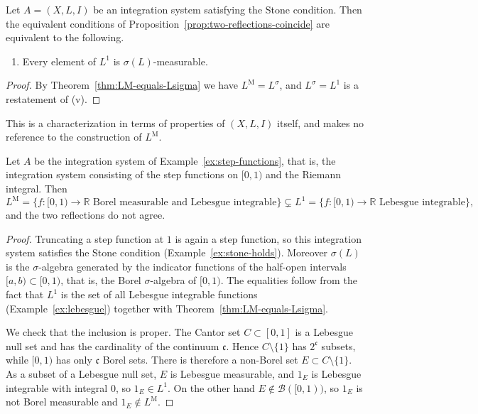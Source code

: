 \begin{corollary}\label{cor:when-coincide-sigma}
  Let $A=(X,L,I)$ be an integration system satisfying the Stone condition.
  Then the equivalent conditions of
  Proposition~\ref{prop:two-reflections-coincide} are equivalent to the
  following.
  \begin{enumerate}
    \item[(v)] Every element of $L^1$ is $\sigma(L)$-measurable.
  \end{enumerate}
\end{corollary}
\begin{proof}
  By Theorem~\ref{thm:LM-equals-Lsigma} we have
  $L^{\mathrm{M}}=L^{\sigma}$, and $L^{\sigma}=L^1$ is a restatement of (v).
\end{proof}

\noindent
This is a characterization in terms of properties of $(X,L,I)$ itself, and makes
no reference to the construction of $L^{\mathrm{M}}$.

\begin{corollary}\label{cor:lebesgue-reflections-differ}
  Let $A$ be the integration system of Example~\ref{ex:step-functions}, that is,
  the integration system consisting of the step functions on $[0,1)$ and the
  Riemann integral. Then
  \[
    L^{\mathrm{M}}=\{f:[0,1)\to\mathbb{R}\text{ Borel measurable and Lebesgue integrable}\}
    \subsetneq L^1
    =\{f:[0,1)\to\mathbb{R}\text{ Lebesgue integrable}\} ,
  \]
  and the two reflections do not agree.
\end{corollary}
\begin{proof}
  Truncating a step function at $1$ is again a step function, so this
  integration system satisfies the Stone condition
  (Example~\ref{ex:stone-holds}).
  Moreover $\sigma(L)$ is the $\sigma$-algebra generated by the indicator
  functions of the half-open intervals $[a,b)\subset[0,1)$, that is, the Borel
  $\sigma$-algebra of $[0,1)$.
  The equalities follow from the fact that $L^1$ is the set of all Lebesgue
  integrable functions (Example~\ref{ex:lebesgue}) together with
  Theorem~\ref{thm:LM-equals-Lsigma}.

  We check that the inclusion is proper. The Cantor set $C\subset[0,1]$ is a
  Lebesgue null set and has the cardinality of the continuum $\mathfrak{c}$.
  Hence $C\setminus\{1\}$ has $2^{\mathfrak{c}}$ subsets, while $[0,1)$ has only
  $\mathfrak{c}$ Borel sets.
  There is therefore a non-Borel set $E\subset C\setminus\{1\}$.
  As a subset of a Lebesgue null set, $E$ is Lebesgue measurable, and $1_E$ is
  Lebesgue integrable with integral $0$, so $1_E\in L^1$.
  On the other hand $E\notin\mathcal{B}([0,1))$, so $1_E$ is not Borel
  measurable and $1_E\notin L^{\mathrm{M}}$.
\end{proof}


